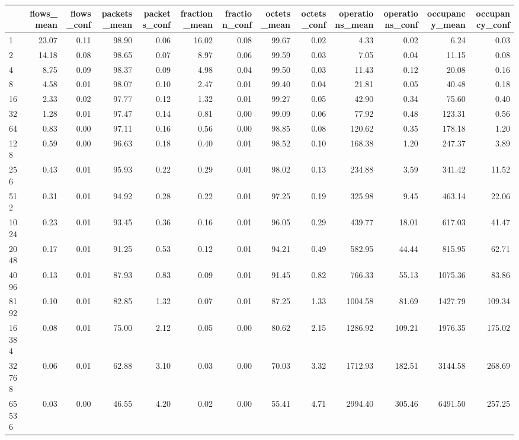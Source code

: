 \begin{tabular}{lrrrrrrrrrrrr}
\toprule
 & flows_mean & flows_conf & packets_mean & packets_conf & fraction_mean & fraction_conf & octets_mean & octets_conf & operations_mean & operations_conf & occupancy_mean & occupancy_conf \\
\midrule
1 & 23.07 & 0.11 & 98.90 & 0.06 & 16.02 & 0.08 & 99.67 & 0.02 & 4.33 & 0.02 & 6.24 & 0.03 \\
2 & 14.18 & 0.08 & 98.65 & 0.07 & 8.97 & 0.06 & 99.59 & 0.03 & 7.05 & 0.04 & 11.15 & 0.08 \\
4 & 8.75 & 0.09 & 98.37 & 0.09 & 4.98 & 0.04 & 99.50 & 0.03 & 11.43 & 0.12 & 20.08 & 0.16 \\
8 & 4.58 & 0.01 & 98.07 & 0.10 & 2.47 & 0.01 & 99.40 & 0.04 & 21.81 & 0.05 & 40.48 & 0.18 \\
16 & 2.33 & 0.02 & 97.77 & 0.12 & 1.32 & 0.01 & 99.27 & 0.05 & 42.90 & 0.34 & 75.60 & 0.40 \\
32 & 1.28 & 0.01 & 97.47 & 0.14 & 0.81 & 0.00 & 99.09 & 0.06 & 77.92 & 0.48 & 123.31 & 0.56 \\
64 & 0.83 & 0.00 & 97.11 & 0.16 & 0.56 & 0.00 & 98.85 & 0.08 & 120.62 & 0.35 & 178.18 & 1.20 \\
128 & 0.59 & 0.00 & 96.63 & 0.18 & 0.40 & 0.01 & 98.52 & 0.10 & 168.38 & 1.20 & 247.37 & 3.89 \\
256 & 0.43 & 0.01 & 95.93 & 0.22 & 0.29 & 0.01 & 98.02 & 0.13 & 234.88 & 3.59 & 341.42 & 11.52 \\
512 & 0.31 & 0.01 & 94.92 & 0.28 & 0.22 & 0.01 & 97.25 & 0.19 & 325.98 & 9.45 & 463.14 & 22.06 \\
1024 & 0.23 & 0.01 & 93.45 & 0.36 & 0.16 & 0.01 & 96.05 & 0.29 & 439.77 & 18.01 & 617.03 & 41.47 \\
2048 & 0.17 & 0.01 & 91.25 & 0.53 & 0.12 & 0.01 & 94.21 & 0.49 & 582.95 & 44.44 & 815.95 & 62.71 \\
4096 & 0.13 & 0.01 & 87.93 & 0.83 & 0.09 & 0.01 & 91.45 & 0.82 & 766.33 & 55.13 & 1075.36 & 83.86 \\
8192 & 0.10 & 0.01 & 82.85 & 1.32 & 0.07 & 0.01 & 87.25 & 1.33 & 1004.58 & 81.69 & 1427.79 & 109.34 \\
16384 & 0.08 & 0.01 & 75.00 & 2.12 & 0.05 & 0.00 & 80.62 & 2.15 & 1286.92 & 109.21 & 1976.35 & 175.02 \\
32768 & 0.06 & 0.01 & 62.88 & 3.10 & 0.03 & 0.00 & 70.03 & 3.32 & 1712.93 & 182.51 & 3144.58 & 268.69 \\
65536 & 0.03 & 0.00 & 46.55 & 4.20 & 0.02 & 0.00 & 55.41 & 4.71 & 2994.40 & 305.46 & 6491.50 & 257.25 \\

\end{tabular}
